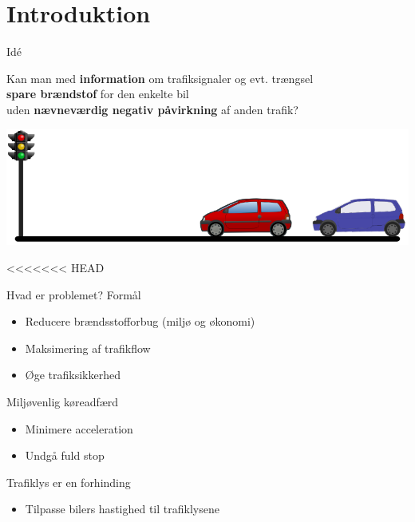 \section{Introduktion}

\begin{frame}{Idé}
\begin{center}
Kan man med \textbf{information} om trafiksignaler og evt. trængsel\\\textbf{spare brændstof} for den enkelte bil\\uden \textbf{nævneværdig negativ påvirkning} af anden trafik?
\end{center}
\includegraphics[width=1\textwidth]{../images/idea.png}
\end{frame}

<<<<<<< HEAD
\begin{frame}{Hvad er problemet?}
Formål
\begin{itemize}
\item Reducere brændsstofforbug (miljø og økonomi)
\item Maksimering af trafikflow
\item Øge trafiksikkerhed
\end{itemize}

\vspace{5mm}
Miljøvenlig køreadfærd
\begin{itemize}
\item Minimere acceleration
\item Undgå fuld stop
\end{itemize}

\vspace{5mm}
Trafiklys er en forhinding
\begin{itemize}
\item Tilpasse bilers hastighed til trafiklysene
\end{itemize}
\end{frame}

